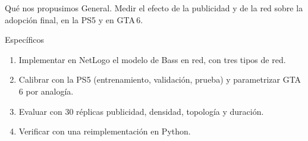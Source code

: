 \documentclass[aspectratio=169,11pt,notes=only]{beamer}
\newcommand{\seccion}{}
\begin{document}
\renewcommand{\seccion}{Objetivos}
\begin{frame}{Qué nos propusimos}
  \vskip2mm
  {\plexmedia General.} Medir el efecto de la publicidad y de la red sobre la adopción final, en la PS5 y en GTA\,6.\par\vskip5mm
  {\plexmedia Específicos}\par\vskip1mm
  \begin{enumerate}
    \item Implementar en NetLogo el modelo de Bass en red, con tres tipos de red.
    \item Calibrar con la PS5 (entrenamiento, validación, prueba) y parametrizar GTA\,6 por analogía.
    \item Evaluar con 30 réplicas publicidad, densidad, topología y duración.
    \item Verificar con una reimplementación en Python.
  \end{enumerate}
\end{frame}
\end{document}
